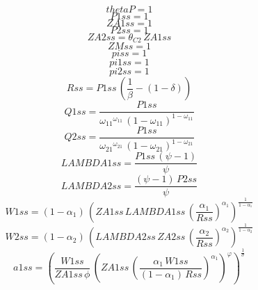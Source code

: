 \begin{dmath*}
thetaP = 1
\end{dmath*}
\begin{dmath*}
P1ss = 1
\end{dmath*}
\begin{dmath*}
ZA1ss = 1
\end{dmath*}
\begin{dmath*}
P2ss = 1
\end{dmath*}
\begin{dmath*}
ZA2ss = {{\theta_{C2}}}\, {ZA1ss}
\end{dmath*}
\begin{dmath*}
ZMss = 1
\end{dmath*}
\begin{dmath*}
piss = 1
\end{dmath*}
\begin{dmath*}
pi1ss = 1
\end{dmath*}
\begin{dmath*}
pi2ss = 1
\end{dmath*}
\begin{dmath*}
Rss = {P1ss}\, \left(\frac{1}{{{\beta}}}-\left(1-{{\delta}}\right)\right)
\end{dmath*}
\begin{dmath*}
Q1ss = \frac{{P1ss}}{{{\omega_{11}}}^{{{\omega_{11}}}}\, \left(1-{{\omega_{11}}}\right)^{1-{{\omega_{11}}}}}
\end{dmath*}
\begin{dmath*}
Q2ss = \frac{{P1ss}}{{{\omega_{21}}}^{{{\omega_{21}}}}\, \left(1-{{\omega_{21}}}\right)^{1-{{\omega_{21}}}}}
\end{dmath*}
\begin{dmath*}
LAMBDA1ss = \frac{{P1ss}\, \left({{\psi}}-1\right)}{{{\psi}}}
\end{dmath*}
\begin{dmath*}
LAMBDA2ss = \frac{\left({{\psi}}-1\right)\, {P2ss}}{{{\psi}}}
\end{dmath*}
\begin{dmath*}
W1ss = \left(1-{{\alpha_{1}}}\right)\, \left({ZA1ss}\, {LAMBDA1ss}\, \left(\frac{{{\alpha_{1}}}}{{Rss}}\right)^{{{\alpha_{1}}}}\right)^{\frac{1}{1-{{\alpha_{1}}}}}
\end{dmath*}
\begin{dmath*}
W2ss = \left(1-{{\alpha_{2}}}\right)\, \left({LAMBDA2ss}\, {ZA2ss}\, \left(\frac{{{\alpha_{2}}}}{{Rss}}\right)^{{{\alpha_{2}}}}\right)^{\frac{1}{1-{{\alpha_{2}}}}}
\end{dmath*}
\begin{dmath*}
a1ss = \left(\frac{{W1ss}}{{ZA1ss}\, {{\phi}}}\, \left({ZA1ss}\, \left(\frac{{{\alpha_{1}}}\, {W1ss}}{\left(1-{{\alpha_{1}}}\right)\, {Rss}}\right)^{{{\alpha_{1}}}}\right)^{{{\varphi}}}\right)^{\frac{1}{{{\sigma}}}}
\end{dmath*}
